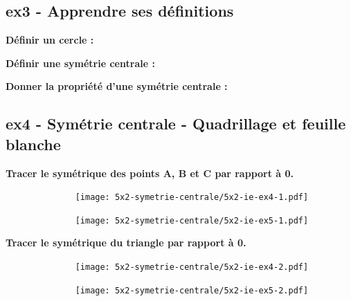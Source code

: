 \subsection*{ex3 - Apprendre ses définitions} 

\textbf{Définir un cercle : } \dotfill \newline
\Pointilles[2]

\textbf{Définir une symétrie centrale : }\dotfill \newline
\Pointilles[2]


\textbf{Donner la propriété d'une symétrie centrale : }\dotfill \newline
\Pointilles[2]


\subsection*{ex4 - Symétrie centrale - Quadrillage et feuille blanche}

\textbf{Tracer le symétrique des points A, B et C par rapport à 0.}

\begin{multicols}{2}

  \begin{figure}[H]
        \centering
        \texttt{[image: 5x2-symetrie-centrale/5x2-ie-ex4-1.pdf]}
  \end{figure}

  \begin{figure}[H]
        \centering
        \texttt{[image: 5x2-symetrie-centrale/5x2-ie-ex5-1.pdf]}
  \end{figure}

\end{multicols}

\textbf{Tracer le symétrique du triangle par rapport à 0.}

\begin{multicols}{2}

  \begin{figure}[H]
        \centering
        \texttt{[image: 5x2-symetrie-centrale/5x2-ie-ex4-2.pdf]}
  \end{figure}

  \begin{figure}[H]
        \centering
        \texttt{[image: 5x2-symetrie-centrale/5x2-ie-ex5-2.pdf]}
  \end{figure}

\end{multicols}

